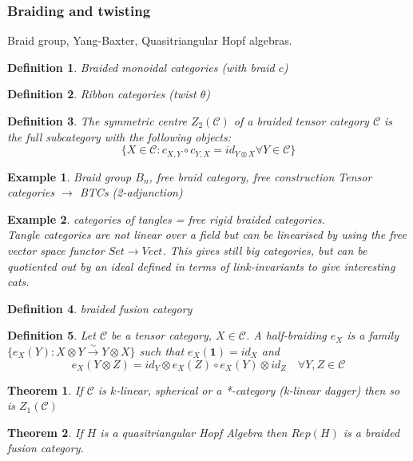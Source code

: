 \documentclass{article}
\newtheorem{definition}{Definition}
\newtheorem{example}{Example}
\newtheorem{theorem}{Theorem}
\begin{document}
\subsubsection{Braiding and twisting}
Braid group, Yang-Baxter, Quasitriangular Hopf algebras.
\begin{definition}
Braided monoidal categories (with braid $c$)
\end{definition}
\begin{definition}
Ribbon categories (twist $\theta$)
\end{definition}
\begin{definition}
The symmetric centre $Z_2(\mathcal{C})$ of a braided tensor category $\mathcal{C}$ is the full subcategory with the following objects:
$$ \{ X \in \mathcal{C} : c_{X,Y} \circ c_{Y,X} = id_{Y\otimes X} \forall Y \in \mathcal{C} \} $$
\end{definition}

\begin{example}
Braid group $B_n$, free braid category, free construction Tensor categories $\rightarrow$ BTCs (2-adjunction)
\end{example}
\begin{example}
categories of tangles = free rigid braided categories.\\
Tangle categories are not linear over a field but can be linearised by using the free vector space functor $Set \rightarrow Vect$. This gives still big categories, but can be quotiented out by an ideal defined in terms of link-invariants to give interesting cats.
\end{example}
\begin{definition}
braided fusion category
\end{definition}
\begin{definition}
Let $\mathcal{C}$ be a tensor category, $X \in \mathcal{C}$. A half-braiding $e_X$ is a family $\{ e_X(Y):X\otimes Y \xrightarrow{\sim} Y\otimes X \}$ such that $e_X(\mathbf{1}) = id_X$ and 
\begin{equation*}
e_X(Y\otimes Z) = id_Y\otimes e_X(Z) \circ e_X(Y) \otimes id_Z \quad \forall Y,Z \in \mathcal{C}
\end{equation*}
\end{definition}

\begin{theorem}
If $\mathcal{C}$ is $k$-linear, spherical or a *-category (k-linear dagger) then so is $Z_1(\mathcal{C})$ 
\end{theorem}
\begin{theorem}
If $H$ is a quasitriangular Hopf Algebra then $Rep(H)$ is a braided fusion category.
\end{theorem}
\end{document}
